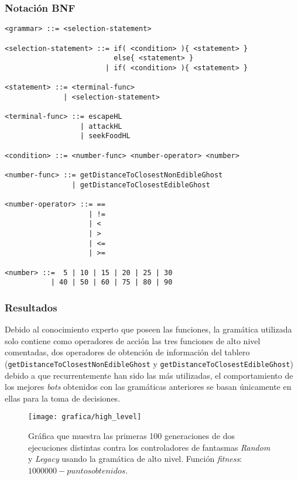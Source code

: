 \subsubsection{Notación BNF}
\begin{lstlisting}[caption={Gramática de alto nivel.}]
<grammar> ::= <selection-statement>

<selection-statement> ::= if( <condition> ){ <statement> }
                          else{ <statement> }
                        | if( <condition> ){ <statement> }

<statement> ::= <terminal-func>
              | <selection-statement>

<terminal-func> ::= escapeHL
                  | attackHL
                  | seekFoodHL

<condition> ::= <number-func> <number-operator> <number>

<number-func> ::= getDistanceToClosestNonEdibleGhost
                | getDistanceToClosestEdibleGhost

<number-operator> ::= ==
                    | !=
                    | <
                    | >
                    | <=
                    | >=

<number> ::=  5 | 10 | 15 | 20 | 25 | 30
           | 40 | 50 | 60 | 75 | 80 | 90
\end{lstlisting}

\subsubsection{Resultados}
Debido al conocimiento experto que poseen las funciones, la gramática utilizada solo contiene como operadores de acción las tres funciones de alto nivel comentadas, dos operadores de obtención de información del tablero  (\texttt{getDistanceToClosestNonEdibleGhost} y \texttt{getDistanceToClosestEdibleGhost}) debido a que recurrentemente han sido las más utilizadas, el comportamiento de los mejores \textit{bots} obtenidos con las gramáticas anteriores se basan únicamente en ellas para la toma de decisiones.
\begin{figure}[H]
\centering
\texttt{[image: grafica/high\_level]}
\caption{Gráfica que muestra las primeras 100 generaciones de dos ejecuciones distintas contra los controladores de fantasmas \textit{Random} y \textit{Legacy} usando la gramática de alto nivel. Función \textit{fitness}: $1000000 - puntos obtenidos$.}
\end{figure}


